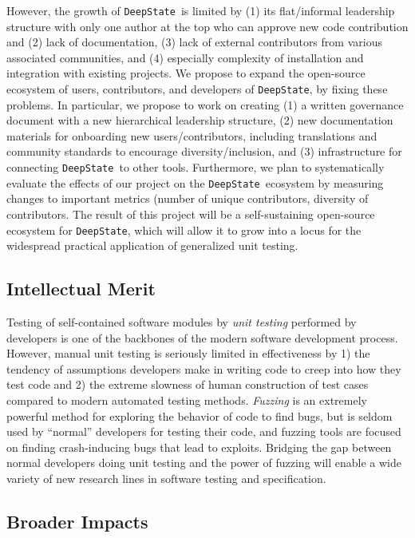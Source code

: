 \documentclass[numbers]{proposalnsf}
\newcommand{\ds}{\texttt{DeepState}}
\begin{document}
However, the growth of \ds\ is limited by (1) its flat/informal leadership structure with only one author at the top who can approve new code contribution and (2) lack of documentation, (3) lack of external contributors from various associated communities, and (4) especially complexity of installation and integration with existing projects.
We propose to expand the open-source ecosystem of users, contributors, and developers of \ds, by fixing these problems.
In particular, we propose to work on creating (1) a written governance document with a new hierarchical leadership structure, (2) new documentation materials for onboarding new users/contributors, including translations and community standards to encourage diversity/inclusion, and (3) infrastructure for connecting \ds\ to other tools.
Furthermore, we plan to systematically evaluate the effects of our project on the \ds\ ecosystem by measuring changes to important metrics (number of unique contributors, diversity of contributors. 
The result of this project will be a self-sustaining open-source ecosystem for \ds, which will allow it to grow into a locus for the widespread practical application of generalized unit testing.

\subsection*{Intellectual Merit} 
\vspace{-2mm}
Testing of self-contained software modules by \emph{unit testing} performed by developers is one of the backbones of the modern software development process.  However, manual unit testing is seriously limited in effectiveness by 1) the tendency of assumptions developers make in writing code to creep into how they test code and 2) the extreme slowness of human construction of test cases compared to modern automated testing methods.  \emph{Fuzzing} is an extremely powerful method for exploring the behavior of code to find bugs, but is seldom used by ``normal'' developers for testing their code, and fuzzing tools are focused on finding crash-inducing bugs that lead to exploits.  Bridging the gap between normal developers doing unit testing and the power of fuzzing will enable a wide variety of new research lines in software testing and specification.

\subsection*{Broader Impacts}
\vspace{-2mm}
\end{document}
